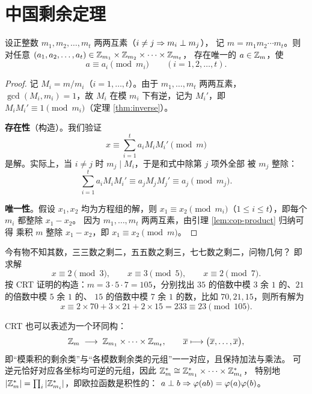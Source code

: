 \section{中国剩余定理}\label{sec:crt}

\begin{theorem}\label{thm:crt}
设正整数 $m_1,m_2,\ldots,m_t$ 两两互素（$i\ne j\Rightarrow m_i\perp m_j$），
记 $m=m_1m_2\cdots m_t$。则对任意
$(a_1,a_2,\ldots,a_t)\in\mathbb{Z}_{m_1}\times\mathbb{Z}_{m_2}\times\cdots\times\mathbb{Z}_{m_t}$，
存在唯一的 $a\in\mathbb{Z}_m$，使
\[
  a\equiv a_i\pmod{m_i}\qquad(i=1,2,\ldots,t).
\]
\end{theorem}

\begin{proof}
记 $M_i=m/m_i$（$i=1,\ldots,t$）。由于 $m_1,\ldots,m_t$ 两两互素，
$\gcd(M_i,m_i)=1$，故 $M_i$ 在模 $m_i$ 下有逆，记为 $M_i'$，即
$M_iM_i'\equiv1\pmod{m_i}$（定理 \ref{thm:inverse}）。

\textbf{存在性}（构造）。我们验证
\[
  x\equiv\sum_{i=1}^{t}a_iM_iM_i'\pmod m
\]
是解。实际上，当 $i\ne j$ 时 $m_j\mid M_i$，于是和式中除第 $j$ 项外全部
被 $m_j$ 整除：
\[
  \sum_{i=1}^{t}a_iM_iM_i'\equiv a_jM_jM_j'\equiv a_j\pmod{m_j}.
\]

\textbf{唯一性}。假设 $x_1,x_2$ 均为方程组的解，则
$x_1\equiv x_2\pmod{m_i}$（$1\le i\le t$），即每个 $m_i$ 都整除 $x_1-x_2$。
因为 $m_1,\ldots,m_t$ 两两互素，由引理 \ref{lem:cop-product} 归纳可得
乘积 $m$ 整除 $x_1-x_2$，即 $x_1\equiv x_2\pmod m$。
\end{proof}

\begin{example}
今有物不知其数，三三数之剩二，五五数之剩三，七七数之剩二，问物几何？
即求解
\[
  x\equiv2\pmod3,\qquad x\equiv3\pmod5,\qquad x\equiv2\pmod7.
\]
按 CRT 证明的构造：$m=3\cdot5\cdot7=105$，分别找出
$35$ 的倍数中模 $3$ 余 $1$ 的、$21$ 的倍数中模 $5$ 余 $1$ 的、
$15$ 的倍数中模 $7$ 余 $1$ 的数，比如 $70,21,15$，则所有解为
\[
  x\equiv2\times70+3\times21+2\times15=233\equiv23\pmod{105}.
\]
\end{example}

\begin{remark}
CRT 也可以表述为一个环同构：
\[
  \mathbb{Z}_m\;\longrightarrow\;\mathbb{Z}_{m_1}\times\cdots\times\mathbb{Z}_{m_t},\qquad
  \overline{x}\longmapsto
  \bigl(\overline{x},\ldots,\overline{x}\bigr),
\]
即“模乘积的剩余类”与“各模数剩余类的元组”一一对应，且保持加法与乘法。
可逆元恰好对应各坐标均可逆的元组，因此
$\mathbb{Z}_m^{*}\cong\mathbb{Z}_{m_1}^{*}\times\cdots\times\mathbb{Z}_{m_t}^{*}$，
特别地 $|\mathbb{Z}_m^{*}|=\prod_i|\mathbb{Z}_{m_i}^{*}|$，即欧拉函数是积性的：
$a\perp b\Rightarrow\varphi(ab)=\varphi(a)\varphi(b)$。
\end{remark}
